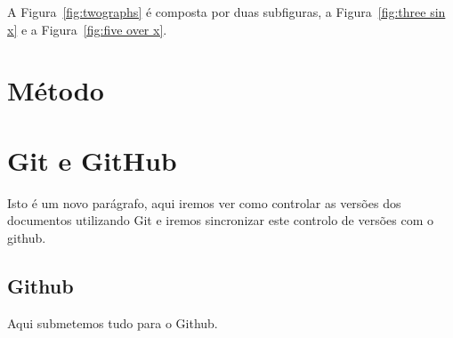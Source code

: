 \documentclass[11pt, a4paper]{article}
\begin{document}
    A Figura~\ref{fig:twographs} é composta por duas subfiguras, a Figura~\ref{fig:three sin x} e a Figura~\ref{fig:five over x}.

    \pagebreak

    \section{Método}\label{sec:metodo}

    \lipsum[6-7]

    \section{Git e GitHub}\label{sec:outrometodo}

    Isto é um novo parágrafo, aqui iremos ver como controlar as versões dos documentos utilizando Git e iremos sincronizar este controlo de versões com o github.

    \subsection{Github}\label{sec_github}

    Aqui submetemos tudo para o Github.

%    
%    
\end{document}
